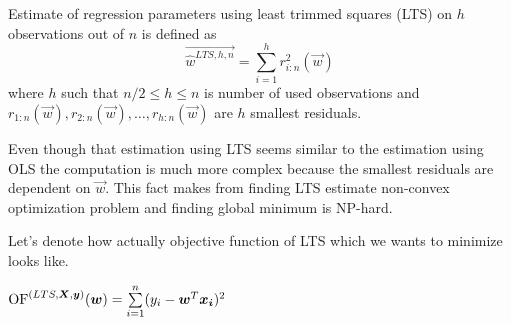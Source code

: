 \begin{definition} Estimate of regression parameters using least trimmed squares (LTS) on $h$ observations out of $n$ is defined as
    \begin{equation}
        \vec{\hat{w}^{LTS, h, n}} =  \sum\limits_{i=1}^h r_{i:n}^2(\vec{w}) 
    \end{equation}
    where $h$ such that $ n/2 \leq h \leq n$ is number of used observations and 
    $r_{1:n}(\vec{w}), r_{2:n}(\vec{w}),\ldots, r_{h:n}(\vec{w})$ are $h$ smallest residuals.
\end{definition}

Even though that estimation using LTS seems similar to the estimation using OLS the computation is much more complex because the smallest residuals are dependent on $\vec{w}$. This fact makes from finding LTS estimate non-convex optimization problem and finding global minimum is NP-hard. 

Let's denote how actually objective function of LTS which we wants to minimize looks like.

\begin{definition} 
    $\operatorname{OF}^{(LTS,\boldsymbol{X}, \boldsymbol{y})}(\boldsymbol{w}) = \sum\limits_{i=1}^n (y_i - \boldsymbol{w}^T\boldsymbol{x_i})^2 $
\end{definition}




